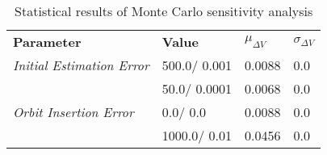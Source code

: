 
                    \begin{table}[]
                    \centering
                    \begin{tabular}{l l l l}
                    \rowcolor[HTML]{EFEFEF} \textbf{Parameter} & \textbf{Value} & \textbf{$\mu_{\Delta V}$} & \textbf{$\sigma_{\Delta V}$} \\
                    \textit{Initial Estimation Error} & 500.0/
0.001 & 0.0088 & 0.0 \\
 & 50.0/
0.0001 & 0.0068 & 0.0 \\
\textit{Orbit Insertion Error} & 0.0/
0.0 & 0.0088 & 0.0 \\
 & 1000.0/
0.01 & 0.0456 & 0.0 \\

                    \end{tabular}
                    \caption{Statistical results of Monte Carlo sensitivity analysis}
                    \label{tab:SensitivityAnalysis}
                    \end{table}
                    